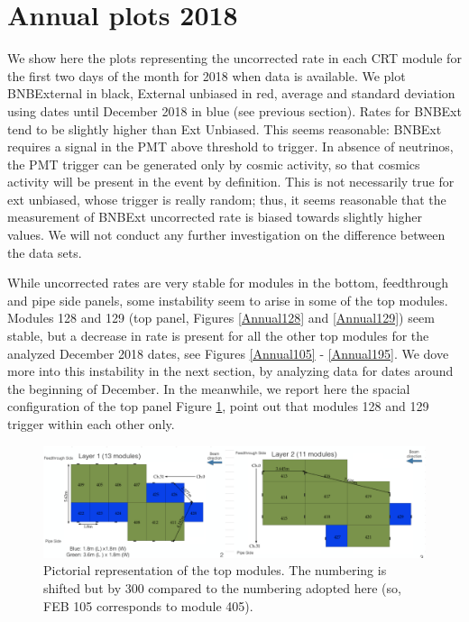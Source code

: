 \section{Annual plots 2018} \label{appendix:AnnualPlots2018}
We show here the plots representing the uncorrected rate in each CRT module for the first two days of the month for 2018 when data is available.
We plot BNBExternal in black, External unbiased in red, average and standard deviation using dates until December 2018 in blue (see previous section). 
Rates for BNBExt tend to be slightly higher than Ext Unbiased. This seems reasonable: BNBExt requires a signal in the PMT above threshold to trigger. In absence of neutrinos,  the PMT trigger can be generated only by cosmic activity, so that cosmics activity will be present in the event by definition. This is not necessarily true for ext unbiased, whose trigger is really random; thus, it seems reasonable that the measurement of BNBExt uncorrected rate is biased towards slightly higher values. We will not conduct any further investigation on the difference between the data sets.

While uncorrected rates are very stable for modules in the bottom, feedthrough and pipe side panels, some instability seem to arise in some of the top modules. 
Modules 128 and 129 (top panel, Figures  \ref{Annual128} and  \ref{Annual129}) seem stable, but a decrease in rate is present for all the other top modules for the analyzed December 2018 dates, see Figures \ref{Annual105} - \ref{Annual195}. We dove more into this instability in the next section, by analyzing data for dates around the beginning of December.
In the meanwhile, we report here the spacial configuration of the top panel Figure \ref{fig:TOP}, point out that modules 128 and 129 trigger within each other only.
\begin{figure}[h!]
\centering
\includegraphics[width=\textwidth]{images/top.png}
\caption{Pictorial representation of the top modules. The numbering is shifted but by 300 compared to the numbering adopted here (so, FEB 105 corresponds to module 405).}
\label{fig:TOP}
\end{figure}


